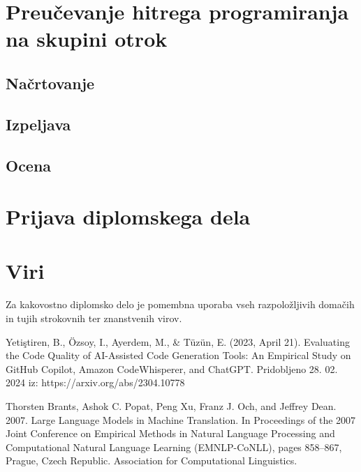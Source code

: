 \documentclass[12pt,a4paper]{book}
\begin{document}
\chapter{Preučevanje hitrega programiranja na skupini otrok}
\section{Načrtovanje}

\section{Izpeljava}

\section{Ocena}

\chapter{Prijava diplomskega dela}





\chapter{Viri}
Za kakovostno diplomsko delo je pomembna uporaba vseh razpoložljivih doma\-čih in tujih strokovnih ter znanstvenih virov.

Yetiştiren, B., Özsoy, I., Ayerdem, M., \& Tüzün, E. (2023, April 21). Evaluating the Code Quality of AI-Assisted Code Generation Tools: An Empirical Study on GitHub Copilot, Amazon CodeWhisperer, and ChatGPT. Pridobljeno 28. 02. 2024 iz: https://arxiv.org/abs/2304.10778

Thorsten Brants, Ashok C. Popat, Peng Xu, Franz J. Och, and Jeffrey Dean. 2007. Large Language Models in Machine Translation. In Proceedings of the 2007 Joint Conference on Empirical Methods in Natural Language Processing and Computational Natural Language Learning (EMNLP-CoNLL), pages 858–867, Prague, Czech Republic. Association for Computational Linguistics.
\end{document}
